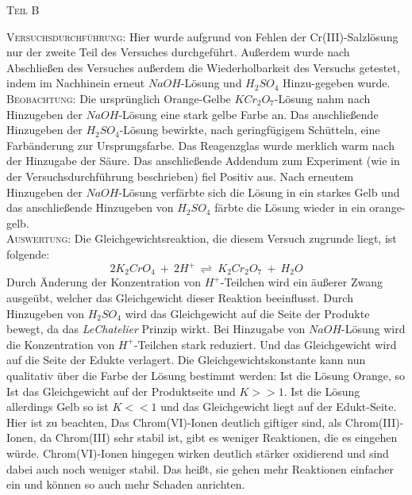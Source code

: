\documentclass[12pt, a4paper]{article}
\begin{document}
\begin{center}
\textsc{Teil B}
\end{center}
\textsc{Versuchsdurchführung:} Hier wurde aufgrund von Fehlen der Cr(III)-Salzlösung nur der zweite Teil des Versuches durchgeführt. Außerdem wurde nach Abschließen des Versuches außerdem die Wiederholbarkeit des Versuchs getestet, indem im Nachhinein erneut $NaOH$-Lösung und $H_2SO_4$ Hinzu-gegeben wurde. \\

\textsc{Beobachtung:}\hspace{5mm} Die ursprünglich Orange-Gelbe $KCr_2O_7$-Lösung nahm nach Hinzugeben der $NaOH$-Lösung eine stark gelbe Farbe an. Das anschließende Hinzugeben der $H_2SO_4$-Lösung bewirkte, nach geringfügigem Schütteln, eine Farbänderung zur Ursprungsfarbe. Das Reagenzglas wurde merklich warm nach der Hinzugabe der Säure. Das anschließende Addendum zum Experiment (wie in der Versuchsdurchführung beschrieben) fiel Positiv aus. Nach erneutem Hinzugeben der $NaOH$-Lösung verfärbte sich die Lösung in ein starkes Gelb und das anschließende Hinzugeben von $H_2SO_4$ färbte die Lösung wieder in ein orange-gelb.\\

\textsc{Auswertung:}\hspace{8mm} Die Gleichgewichtsreaktion, die diesem Versuch zugrunde liegt, ist folgende: $$2K_2CrO_4\ +\ 2H^+\ \rightleftharpoons\ K_2Cr_2O_7\ +\ H_2O$$ Durch Änderung der Konzentration von $H^+$-Teilchen wird ein äußerer Zwang ausgeübt, welcher das Gleichgewicht dieser Reaktion beeinflusst. Durch Hinzugeben von $H_2SO_4$ wird das Gleichgewicht auf die Seite der Produkte bewegt, da das \textit{LeChatelier} Prinzip wirkt. Bei Hinzugabe von $NaOH$-Lösung wird die Konzentration von $H^+$-Teilchen stark reduziert. Und das Gleichgewicht wird auf die Seite der Edukte verlagert. Die Gleichgewichtskonstante kann nun qualitativ über die Farbe der Lösung bestimmt werden: Ist die Lösung Orange, so Ist das Gleichgewicht auf der Produktseite und $K>>1$. Ist die Lösung allerdings Gelb so ist $K<<1$ und das Gleichgewicht liegt auf der Edukt-Seite.\\ Hier ist zu beachten, Das Chrom(VI)-Ionen deutlich giftiger sind, als Chrom(III)-Ionen, da Chrom(III) sehr stabil ist, gibt es weniger Reaktionen, die es eingehen würde. Chrom(VI)-Ionen hingegen wirken deutlich stärker oxidierend und sind dabei auch noch weniger stabil. Das heißt, sie gehen mehr Reaktionen einfacher ein und können so auch mehr Schaden anrichten.
\end{document}
